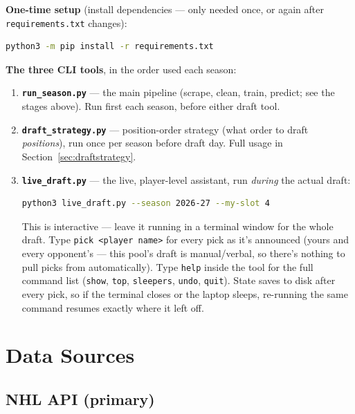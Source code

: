 \documentclass[11pt, a4paper]{article}
\begin{document}
\textbf{One-time setup} (install dependencies — only needed once, or again after
\texttt{requirements.txt} changes):

\begin{lstlisting}[language=bash]
python3 -m pip install -r requirements.txt
\end{lstlisting}

\textbf{The three CLI tools}, in the order used each season:

\begin{enumerate}[leftmargin=*]
  \item \textbf{\texttt{run\_season.py}} — the main pipeline (scrape, clean, train, predict; see
        the stages above). Run first each season, before either draft tool.
  \item \textbf{\texttt{draft\_strategy.py}} — position-order strategy (what order to draft
        \emph{positions}), run once per season before draft day. Full usage in
        Section~\ref{sec:draftstrategy}.
  \item \textbf{\texttt{live\_draft.py}} — the live, player-level assistant, run \emph{during}
        the actual draft:
        \begin{lstlisting}[language=bash]
python3 live_draft.py --season 2026-27 --my-slot 4
        \end{lstlisting}
        This is interactive — leave it running in a terminal window for the whole draft. Type
        \texttt{pick <player name>} for every pick as it's announced (yours and every
        opponent's — this pool's draft is manual/verbal, so there's nothing to pull picks from
        automatically). Type \texttt{help} inside the tool for the full command list
        (\texttt{show}, \texttt{top}, \texttt{sleepers}, \texttt{undo}, \texttt{quit}). State
        saves to disk after
        every pick, so if the terminal closes or the laptop sleeps, re-running the same command
        resumes exactly where it left off.
\end{enumerate}


\section{Data Sources}
\label{sec:data}

\subsection{NHL API (primary)}
\end{document}
